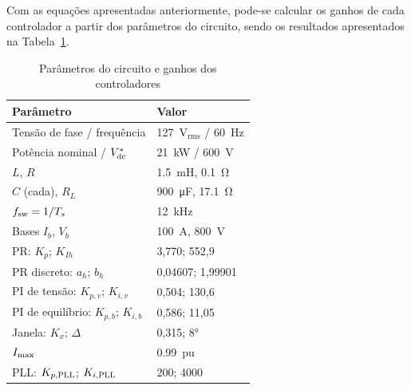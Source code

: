 Com as equações apresentadas anteriormente, pode-se calcular os ganhos de cada controlador
a partir dos parâmetros do circuito, sendo os resultados apresentados na Tabela~\ref{tab:param}.

\begin{table}[!t]\centering
\caption{Parâmetros do circuito e ganhos dos controladores}\label{tab:param}
\begin{tabular}{@{}ll@{}}\toprule
Parâmetro & Valor\\\midrule
Tensão de fase / frequência & 127~V$_\mathrm{rms}$ / \SI{60}{Hz}\\
Potência nominal / $V_{\mathrm{dc}}^*$ & \SI{21}{kW} / \SI{600}{V}\\
$L$, $R$ & \SI{1,5}{mH}, \SI{0,1}{\ohm}\\
$C$ (cada), $R_L$ & \SI{900}{\micro F}, \SI{17,1}{\ohm}\\
$f_{\mathrm{sw}}=1/T_s$ & \SI{12}{kHz}\\
Bases $I_b$, $V_b$ & \SI{100}{A}, \SI{800}{V}\\\midrule
PR: $K_p$; $K_{Ih}$ & 3,770; 552,9\\
PR discreto: $a_h$; $b_h$ & 0,04607; 1,99901\\
PI de tensão: $K_{p,v}$; $K_{i,v}$ & 0,504; 130,6\\
PI de equilíbrio: $K_{p,b}$; $K_{i,b}$ & 0,586; 11,05\\
Janela: $K_x$; $\Delta$ & 0,315; \ang{8}\\
$I_{\mathrm{max}}$ & \SI{0,99}{pu}\\
PLL: $K_{p,\mathrm{PLL}}$; $K_{i,\mathrm{PLL}}$ & 200; 4000\\\bottomrule
\end{tabular}\end{table}

